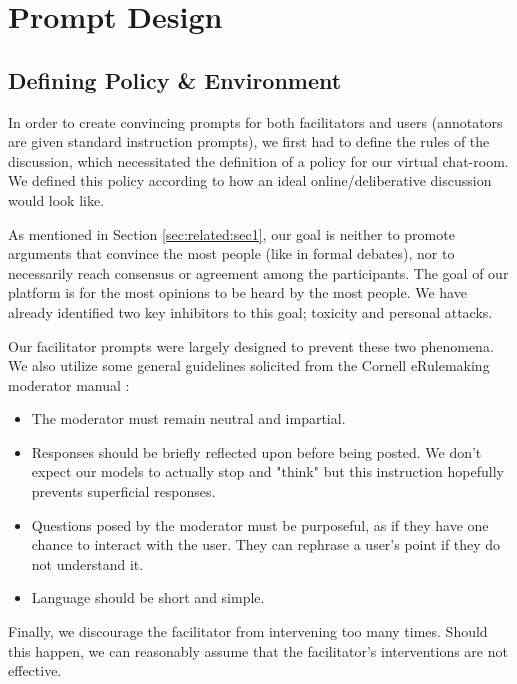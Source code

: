 \section{Prompt Design}
\label{sec:system:design-prompt}

\subsection{Defining Policy \& Environment}

In order to create convincing prompts for both facilitators and users (annotators are given standard instruction prompts), we first had to define the rules of the discussion, which necessitated the definition of a policy for our virtual chat-room. We defined this policy according to how an ideal online/deliberative discussion would look like.

As mentioned in Section \ref{sec:related:sec1}, our goal is neither to promote arguments that convince the most people (like in formal debates), nor to necessarily reach consensus or agreement among the participants. The goal of our platform is for the most opinions to be heard by the most people. We have already identified two key inhibitors to this goal; toxicity and personal attacks.

Our facilitator prompts were largely designed to prevent these two phenomena. We also utilize some general guidelines solicited from the Cornell eRulemaking moderator manual \cite{Cornell_eRulemaking2017}:

\begin{itemize}
	\item The moderator must remain neutral and impartial. 
	
	\item Responses should be briefly reflected upon before being posted. We don't expect our models to actually stop and "think" but this instruction hopefully prevents superficial responses.
	
	\item Questions posed by the moderator must be purposeful, as if they have one chance to interact with the user. They can rephrase a user's point if they do not understand it.
	
	\item Language should be short and simple.
\end{itemize}

Finally, we discourage the facilitator from intervening too many times. Should this happen, we can reasonably assume that the facilitator's interventions are not effective.

